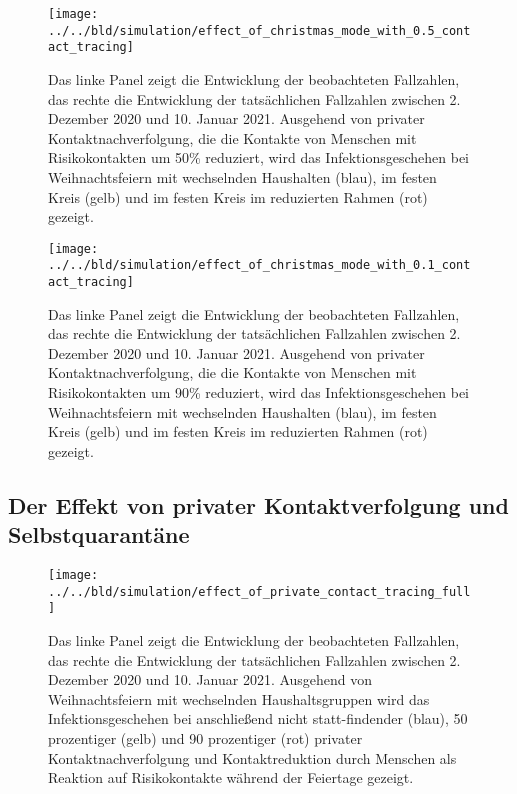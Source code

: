 \documentclass[a4paper,11pt,leqno,fleqn]{article}
\begin{document}
\begin{figure}
\label{fig:effect_of_christmas_with_mediocre_contact_tracing}
\texttt{[image: ../../bld/simulation/effect\_of\_christmas\_mode\_with\_0.5\_contact\_tracing]}
\caption{
    Das linke Panel zeigt die Entwicklung der beobachteten Fallzahlen, das rechte die Entwicklung der tatsächlichen Fallzahlen zwischen 2. Dezember 2020 und 10. Januar 2021. Ausgehend von privater Kontaktnachverfolgung, die die Kontakte von Menschen mit Risikokontakten um 50\% reduziert, wird das Infektionsgeschehen bei Weihnachtsfeiern mit wechselnden Haushalten (blau), im festen Kreis (gelb) und im festen Kreis im reduzierten Rahmen (rot) gezeigt.
}
\end{figure}


\begin{figure}
\label{fig:effect_of_christmas_with_good_contact_tracing}
\texttt{[image: ../../bld/simulation/effect\_of\_christmas\_mode\_with\_0.1\_contact\_tracing]}
\caption{
    Das linke Panel zeigt die Entwicklung der beobachteten Fallzahlen, das rechte die Entwicklung der tatsächlichen Fallzahlen zwischen 2. Dezember 2020 und 10. Januar 2021. Ausgehend von privater Kontaktnachverfolgung, die die Kontakte von Menschen mit Risikokontakten um 90\% reduziert, wird das Infektionsgeschehen bei Weihnachtsfeiern mit wechselnden Haushalten (blau), im festen Kreis (gelb) und im festen Kreis im reduzierten Rahmen (rot) gezeigt.
}
\end{figure}

\FloatBarrier
\subsection{Der Effekt von privater Kontaktverfolgung und Selbstquarantäne}


\begin{figure}
\label{fig:effect_of_contact_tracing_with_full_christmas}
\texttt{[image: ../../bld/simulation/effect\_of\_private\_contact\_tracing\_full]}
\caption{
    Das linke Panel zeigt die Entwicklung der beobachteten Fallzahlen, das rechte die Entwicklung der tatsächlichen Fallzahlen zwischen 2. Dezember 2020 und 10. Januar 2021. Ausgehend von Weihnachtsfeiern mit wechselnden Haushaltsgruppen wird das Infektionsgeschehen bei anschließend nicht statt-findender (blau), 50 prozentiger (gelb) und 90 prozentiger (rot)
    privater Kontaktnachverfolgung und Kontaktreduktion durch Menschen als Reaktion auf Risikokontakte während der Feiertage gezeigt.
}
\end{figure}
\end{document}
